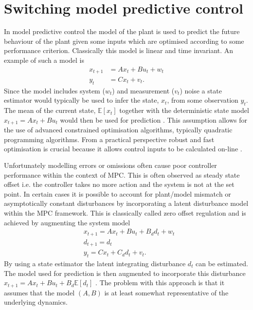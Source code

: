 \section{Switching model predictive control}
\label{sec_switch_mpc_lit}
In model predictive control the model of the plant is used to predict the future behaviour of the plant given some inputs which are optimised according to some performance criterion. Classically this model is linear and time invariant. An example of such a model is 
\begin{equation}
\begin{aligned}
x_{t+1} &= Ax_t + Bu_t + w_t \\
y_t &= Cx_t + v_t.
\end{aligned}
\label{eq_mpc_nodisturbance_obs}
\end{equation} 
Since the model includes system ($w_t$) and measurement ($v_t$) noise a state estimator would typically be used to infer the state, $x_t$, from some observation $y_t$. The mean of the current state, $\mathbb{E}[x_t]$ together with the deterministic state model $x_{t+1} = Ax_t + Bu_t$ would then be used for prediction \cite{raw}. This assumption allows for the use of advanced constrained optimisation algorithms, typically quadratic programming algorithms. From a practical perspective robust and fast optimisation is crucial because it allows control inputs to be calculated on-line \cite{mac}.

Unfortunately modelling errors or omissions often cause poor controller performance within the context of MPC. This is often observed as steady state offset i.e. the controller takes no more action and the system is not at the set point. In certain cases it is possible to account for plant/model mismatch or asymptotically constant disturbances by incorporating a latent disturbance model within the MPC framework. This is classically called zero offset regulation \cite{raw} and is achieved by augmenting the system model
\begin{equation}
\begin{aligned}
&x_{t+1} = Ax_t + Bu_t + B_d d_t + w_t \\
&d_{t+1} = d_t\\
&y_t = Cx_t + C_d d_t + v_t.
\end{aligned}
\label{eq_mpc_disturbance_obs}
\end{equation}
By using a state estimator the latent integrating disturbance $d_t$ can be estimated. The model used for prediction is then augmented to incorporate this disturbance $x_{t+1} = Ax_t + Bu_t + B_d\mathbb{E}[d_t]$ \cite{lee}. The problem with this approach is that it assumes that the model $(A, B)$ is at least somewhat representative of the underlying dynamics.


